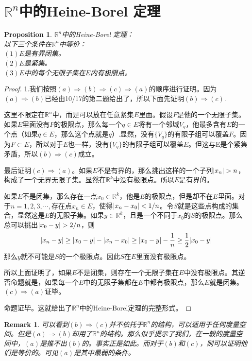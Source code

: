 \documentclass[11pt,a4paper,openany]{book}%
\theoremstyle{plain}%
\newtheorem{pro}{Proposition}[chapter]%
\newtheorem*{rem}{Remark}%
\newcommand{\NO}[1]{{$(#1)$}}%
\begin{document}
\section{$\mathbb{R}^{n}$中的Heine-Borel 定理}
\begin{pro}
$\mathbb{R}^{n}$中的Heine-Borel 定理：\\
以下三个条件在$\mathbb{R}^n$中等价：\\
\NO{1}$E$是有界闭集。\\
\NO{2}$E$是紧集。\\
\NO{3}$E$中的每个无限子集在$E$内有极限点。
\end{pro}
\begin{proof}
1.我们按照$(a)\Rightarrow (b)\Rightarrow (c)\Rightarrow (a)$的顺序进行证明。因为$(a)\Rightarrow (b)$已经由10/17的第二题给出了，所以下面先证明$(b)\Rightarrow (c)$.

这里不限定在$\mathbb{R}^n$中，而是可以放在任意紧集$E$里面。假设$F$是他的一个无限子集。如果$E$里面没有$F$的极限点，那么每一个$q\in E$将有一个邻域$V_q$，他最多含有$E$的一个点（如果$q\in E$，那么这个点就是$q$）.显然，没有$\{V_q\}$的有限子组可以覆盖$F$。因为$F\subset E$，所以对于$E$也一样，没有$\{V_q\}$的有限子组可以覆盖$E$。但这与E是个紧集矛盾，所以$(b)\Rightarrow (c)$成立。

最后证明$(c)\Rightarrow (a)$。如果$E$不是有界的，那么挑出这样的一个子列$\arrowvert x_n\arrowvert>n$，构成了一个无界无限子集。显然在$\mathbb{R}^k$中没有极限点。所以$E$是有界的。

如果$E$不是闭集，那么存在一点$x_0 \in \mathbb{R}^k$，他是$E$的极限点，但是却不在$E$里面。对于$n=1,2,3,\cdots,$存在点$x_n \in E$，使得$\arrowvert x_n-x_0\arrowvert <1/n$。令$S$就是这些点构成的集合，显然这是$E$的无限子集。如果$y \in \mathbb{R}^k$，且是一个不同于$x_0$的$S$的极限点。那么总可以挑出$\arrowvert x_0-y\arrowvert >2/n$，则
\[
\arrowvert x_n-y\arrowvert \geq \arrowvert x_0-y\arrowvert -\arrowvert x_n-x_0\arrowvert \geq \arrowvert x_0-y\arrowvert -\frac{1}{n}\geq \frac{1}{2}\arrowvert x_0-y\arrowvert 
\]
那么$y$就不可能是$S$的一个极限点。因此$S$在$E$里面没有极限点。

所以上面证明了，如果$E$不是闭集，则存在一个无限子集在$E$中没有极限点。其逆否命题就是，如果每一个$E$中的无限子集都在$E$中都有极限点，那么$E$就是闭集。$(c)\Rightarrow (a)$证毕。

命题证毕。这就给出了$\mathbb{R}^n$中的Heine-Borel定理的完整形式。
\end{proof}
\begin{rem}
可以看到$(b)\Rightarrow (c)$并不依托于$\mathbb{R}^n$的结构，可以适用于任何度量空间。但是$(a)\Rightarrow (b)$却用了$\mathbb{R}^n$的结构。那么似乎提示了我们，在一般的度量空间中，$(a)$是推不出$(b)$的。事实正是如此。而对于$(b)$和$(c)$，则可以证明他们是等价的。可见$(a)$是其中最弱的条件。
\end{rem}
\end{document}
